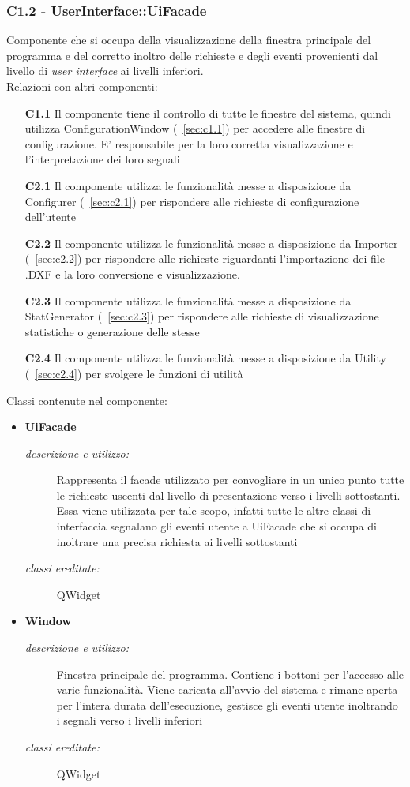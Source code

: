 \subsubsection{C1.2 - UserInterface::UiFacade} \label{sec:c1.2}
Componente che si occupa della visualizzazione della finestra principale del programma e del corretto inoltro delle richieste e degli eventi provenienti dal livello di \textit{user interface} ai livelli inferiori.\\
Relazioni con altri componenti: 
\begin{itemize} 
\item [\textbf{C1.1}]
Il componente tiene il controllo di tutte le finestre del sistema, quindi utilizza ConfigurationWindow (~\ref{sec:c1.1}) per accedere alle finestre di configurazione. E' responsabile per la loro corretta visualizzazione e l'interpretazione dei loro segnali 
\item [\textbf{C2.1}]
Il componente utilizza le funzionalità messe a disposizione da Configurer (~\ref{sec:c2.1}) per rispondere alle richieste di configurazione dell'utente 
\item [\textbf{C2.2}]
Il componente utilizza le funzionalità messe a disposizione da Importer (~\ref{sec:c2.2}) per rispondere alle richieste riguardanti l'importazione dei file .DXF e la loro conversione e visualizzazione. 
\item [\textbf{C2.3}]
Il componente utilizza le funzionalità messe a disposizione da StatGenerator (~\ref{sec:c2.3}) per rispondere alle richieste di visualizzazione statistiche o generazione delle stesse 
\item [\textbf{C2.4}]
Il componente utilizza le funzionalità messe a disposizione da Utility (~\ref{sec:c2.4}) per svolgere le funzioni di utilità 
\end{itemize} 

Classi contenute nel componente: 
\begin{itemize} 
\item \textbf{UiFacade}
\begin{description}
\item [\textit{descrizione e utilizzo:}] Rappresenta il facade utilizzato per convogliare in un unico punto tutte le richieste uscenti dal livello di presentazione verso i livelli sottostanti. Essa viene utilizzata per tale scopo, infatti tutte le altre classi di interfaccia segnalano gli eventi utente a UiFacade che si occupa di inoltrare una precisa richiesta ai livelli sottostanti
\item [\textit{classi ereditate:}] QWidget
\end{description}
\item \textbf{Window}
\begin{description}
\item [\textit{descrizione e utilizzo:}] Finestra principale del programma. Contiene i bottoni per l'accesso alle varie funzionalità. Viene caricata all'avvio del sistema e rimane aperta per l'intera durata dell'esecuzione, gestisce gli eventi utente inoltrando i segnali verso i livelli inferiori
\item [\textit{classi ereditate:}] QWidget
\end{description}
\end{itemize}

